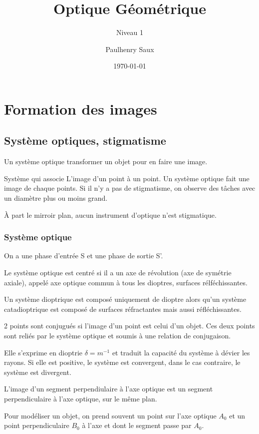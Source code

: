 \documentclass[french]{yLectureNote}
\title{Optique Géométrique}
\subtitle{Niveau 1}
\author{Paulhenry Saux}
\date{\today}
\begin{document}
\setcounter{chapter}{2}
\chapter{Formation des images}
\section{Système optiques, stigmatisme}
\begin{definition}
Un système optique transformer un objet pour en faire une image.
\end{definition}
\begin{definition}[Stigmatisme]
Système qui associe L'image d'un point à un point. Un système optique fait une image de chaque points. Si il n'y a pas de stigmatisme, on observe des t\^aches avec un diamètre plus ou moins grand.
\end{definition}
À part le mirroir plan, aucun instrument d'optique n'est stigmatique.
\subsection{Système optique}
On a une phase d'entrée S et une phase de sortie S'.

Le système optique est centré si il a un axe de révolution (axe de symétrie axiale), appelé axe optique commun à tous les dioptres, surfaces rélféchissantes.
\begin{definition}
Un système dioptrique est composé uniquement de dioptre alors qu'un système catadioptrique est composé de surfaces réfractantes mais aussi réfléchissantes.
\end{definition}
\begin{definition}
2 points sont conjugués si l'image d'un point est celui d'un objet. Ces deux points sont reliés par le système optique et soumis à une relation de conjugaison.
\end{definition}
\begin{definition}
Elle s'exprime en dioptrie $\delta = m^{-1}$ et traduit la capacité du système à dévier les rayons. Si elle est positive, le système est convergent, dans le cas contraire, le système est divergent.
\end{definition}
\begin{definition}[Aplanétisme]
L'image d'un segment perpendiulaire à l'axe optique est un segment perpendiculaire à l'axe optique, sur le m\^eme plan.
\end{definition}
Pour modéliser un objet, on prend souvent un point sur l'axe optique $A_0$ et un point perpendiculaire $B_0$ à l'axe et dont le segment passe par $A_0$. 
\end{document}
